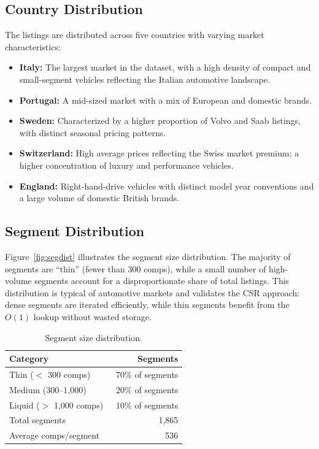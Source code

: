 \documentclass[11pt,a4paper,twoside]{book}
\begin{document}
\subsection{Country Distribution}

The listings are distributed across five countries with varying market characteristics:

\begin{itemize}[leftmargin=*]
    \item \textbf{Italy:} The largest market in the dataset, with a high density of compact
          and small-segment vehicles reflecting the Italian automotive landscape.
    \item \textbf{Portugal:} A mid-sized market with a mix of European and domestic brands.
    \item \textbf{Sweden:} Characterized by a higher proportion of Volvo and Saab listings,
          with distinct seasonal pricing patterns.
    \item \textbf{Switzerland:} High average prices reflecting the Swiss market premium; a
          higher concentration of luxury and performance vehicles.
    \item \textbf{England:} Right-hand-drive vehicles with distinct model year conventions
          and a large volume of domestic British brands.
\end{itemize}

\subsection{Segment Distribution}

Figure~\ref{fig:segdist} illustrates the segment size distribution. The majority of segments
are ``thin'' (fewer than 300 comps), while a small number of high-volume segments account for
a disproportionate share of total listings. This distribution is typical of automotive markets
and validates the CSR approach: dense segments are iterated efficiently, while thin segments
benefit from the $O(1)$ lookup without wasted storage.

\begin{table}[H]
\centering
\caption{Segment size distribution.}
\label{tab:segdist}
\begin{tabular}{@{}lr@{}}
\toprule
\textbf{Category} & \textbf{Segments} \\
\midrule
Thin ($<$ 300 comps)   & ~70\% of segments \\
Medium (300--1,000)     & ~20\% of segments \\
Liquid ($>$ 1,000 comps) & ~10\% of segments \\
\midrule
Total segments          & 1,865 \\
Average comps/segment   & ~536 \\
\bottomrule
\end{tabular}
\end{table}
\end{document}
